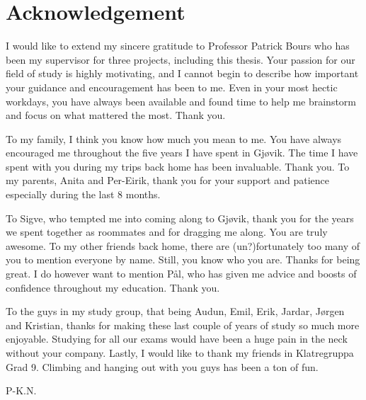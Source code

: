 \chapter*{Acknowledgement}
I would like to extend my sincere gratitude to Professor Patrick Bours who has been my supervisor for three projects, including this thesis. Your passion for our field of study is highly motivating, and I cannot begin to describe how important your guidance and encouragement has been to me. Even in your most hectic workdays, you have always been available and found time to help me brainstorm and focus on what mattered the most. Thank you.

To my family, I think you know how much you mean to me. You have always encouraged me throughout the five years I have spent in Gjøvik. The time I have spent with you during my trips back home has been invaluable. Thank you. To my parents, Anita and Per-Eirik, thank you for your support and patience especially during the last 8 months.

To Sigve, who tempted me into coming along to Gjøvik, thank you for the years we spent together as roommates and for dragging me along. You are truly awesome. To my other friends back home, there are (un?)fortunately too many of you to mention everyone by name. Still, you know who you are. Thanks for being great. I do however want to mention Pål, who has given me advice and boosts of confidence throughout my education. Thank you.

To the guys in my study group, that being Audun, Emil, Erik, Jardar, Jørgen and Kristian, thanks for making these last couple of years of study so much more enjoyable. Studying for all our exams would have been a huge pain in the neck without your company. Lastly, I would like to thank my friends in Klatregruppa Grad 9. Climbing and hanging out with you guys has been a ton of fun. 

\begin{flushright}
P-K.N.\\[1pc]
\end{flushright}